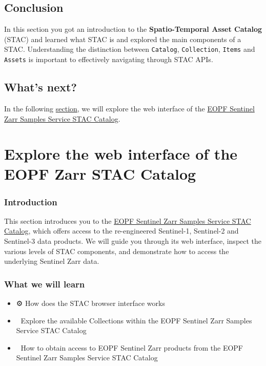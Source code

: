 \documentclass[
  letterpaper,
  DIV=11,
  numbers=noendperiod]{scrreprt}
\providecommand{\tightlist}{%
  \setlength{\itemsep}{0pt}\setlength{\parskip}{0pt}}
\begin{document}
\section{Conclusion}\label{conclusion-5}

In this section you got an introduction to the \textbf{Spatio-Temporal
Asset Catalog} (STAC) and learned what STAC is and explored the main
components of a STAC. Understanding the distinction between
\texttt{Catalog}, \texttt{Collection}, \texttt{Items} and
\texttt{Assets} is important to effectively navigating through STAC
APIs.

\section{What's next?}\label{whats-next-5}

In the following \href{./32_eopf_stac_zarr_tutorial.qmd}{section}, we
will explore the web interface of the
\href{https://stac.browser.user.eopf.eodc.eu/?.language=en}{EOPF
Sentinel Zarr Samples Service STAC Catalog}.

\chapter{Explore the web interface of the EOPF Zarr STAC
Catalog}\label{explore-the-web-interface-of-the-eopf-zarr-stac-catalog}

\subsection{Introduction}\label{introduction-6}

This section introduces you to the
\href{https://stac.browser.user.eopf.eodc.eu/?.language=en}{EOPF
Sentinel Zarr Samples Service STAC Catalog}, which offers access to the
re-engineered Sentinel-1, Sentinel-2 and Sentinel-3 data products. We
will guide you through its web interface, inspect the various levels of
STAC components, and demonstrate how to access the underlying Sentinel
Zarr data.

\subsection{What we will learn}\label{what-we-will-learn-5}

\begin{itemize}
\tightlist
\item
  ⚙️ How does the STAC browser interface works
\item
  🔦 Explore the available Collections within the EOPF Sentinel Zarr
  Samples Service STAC Catalog
\item
  📡 How to obtain access to EOPF Sentinel Zarr products from the EOPF
  Sentinel Zarr Samples Service STAC Catalog
\end{itemize}
\end{document}
